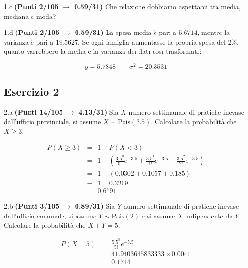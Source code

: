 \documentclass[
  11pt,
]{book}
\theoremstyle{mytheoremstyle}
\theoremstyle{mydefstyle}
\newenvironment{sol}
  {
  \begin{tcolorbox}[enhanced,breakable,arc=0.1mm,boxrule=1pt,colback=white,colframe=iblue,
  title=\bf \fontfamily{lmss}\selectfont \hspace{.5 cm} Soluzione,drop fuzzy shadow]

}{
\end{tcolorbox}
  }
\begin{document}
1.c \textbf{(Punti 2/105 \(\rightarrow\) 0.59/31)} Che relazione dobbiamo aspettarci tra media, mediana e moda?

1.d \textbf{(Punti 2/105 \(\rightarrow\) 0.59/31)} La spesa media è pari a \(5.6714\), mentre la varianza è pari a \(19.5627\).
Se ogni famiglia aumentasse la propria spesa del 2\%, quanto varrebbero la media e la varianza dei dati così trasformati?

\begin{sol}
\[
\bar y = 5.7848\qquad \sigma^2 = 20.3531
\]

\end{sol}

\subsection{Esercizio 2}\label{esercizio-2-35}

2.a \textbf{(Punti 14/105 \(\rightarrow\) 4.13/31)} Sia \(X\) numero settimanale di pratiche inevase dall'ufficio provinciale, si assume \(X\sim\text{Pois}(3.5)\). Calcolare la probabilità che \(X\geq 3\).

\begin{sol}
\begin{eqnarray*}
   P( X \geq 3 ) &=& 1-P( X < 3 ) \\                 &=& 1-\left( \frac{ 3.5 ^{ 0 }}{ 0 !}e^{- 3.5 }+\frac{ 3.5 ^{ 1 }}{ 1 !}e^{- 3.5 }+\frac{ 3.5 ^{ 2 }}{ 2 !}e^{- 3.5 } \right)\\                 &=& 1-( 0.0302+0.1057+0.185 )\\                 &=& 1- 0.3209 \\                 &=&   0.6791 
\end{eqnarray*}

\end{sol}

2.b \textbf{(Punti 3/105 \(\rightarrow\) 0.89/31)} Sia \(Y\) numero settimanale di pratiche inevase dall'ufficio comunale, si assume \(Y\sim\text{Pois}(2)\) e si assume \(X\) indipendente da \(Y\). Calcolare la probabilità che \(X+Y=5\).

\begin{sol}
\begin{eqnarray*}
   P( X = 5 )  &=& \frac{ 5.5 ^{ 5 }}{ 5 !}e^{- 5.5 }\\                 &=& 41.9403645833333 \times 0.0041 \\                 &=& 0.1714 
\end{eqnarray*}

\end{sol}
\end{document}
